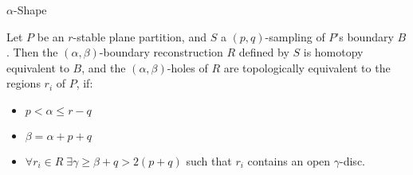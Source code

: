     \begin{frame}{$\alpha$-Shape}
        \begin{theorem}
            Let $P$ be an $r$-stable plane partition, and $S$ a $\left(p,q\right)$-sampling of $P$’s boundary $B$. Then the $\left(\alpha,\beta\right)$-boundary reconstruction $R$ defined by $S$ is homotopy equivalent to $B$, and the $\left(\alpha,\beta\right)$-holes of $R$ are topologically equivalent to the regions $r_i$ of $P$, if:
            \begin{itemize}
                \item $p < \alpha \leq r - q$
                \item $\beta = \alpha + p + q$
                \item $\forall r_i \in R \;\exists \gamma \geq \beta + q > 2\left(p+q\right)$ such that $r_i$ contains an open $\gamma$-disc.
            \end{itemize}
        \end{theorem}
    \end{frame}
